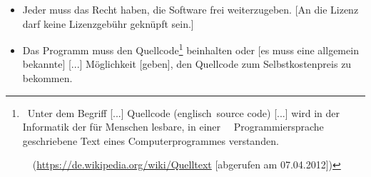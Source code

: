 \documentclass[a4paper]{article}
\newcommand\liststyleWWviiiNumi{%
\renewcommand\theenumi{\arabic{enumi}}
\renewcommand\theenumii{\arabic{enumii}}
\renewcommand\theenumiii{\arabic{enumiii}}
\renewcommand\labelitemi{{}-}
\renewcommand\labelenumi{\theenumi.}
\renewcommand\labelenumii{\theenumii.}
\renewcommand\labelenumiii{\theenumiii.}
}
\newcommand\liststyleWWviiiNumiii{%
\renewcommand\theenumi{\arabic{enumi}}
\renewcommand\theenumii{\arabic{enumii}}
\renewcommand\theenumiii{\arabic{enumiii}}
\renewcommand\labelitemi{{}-}
\renewcommand\labelenumi{\theenumi.}
\renewcommand\labelenumii{\theenumii.}
\renewcommand\labelenumiii{\theenumiii.}
}
\begin{document}
\liststyleWWviiiNumi
\begin{itemize}
\item {
Jeder muss das Recht haben, die Software frei weiterzugeben. [An die
Lizenz darf keine Lizenzgeb\"uhr gekn\"upft sein.]}
\item {
Das Programm muss den Quellcode\footnote{\ {\guillemotright}Unter dem
Begriff [...] Quellcode (englisch~source code) [...] wird in der
Informatik der f\"ur Menschen lesbare, in einer \ \ Programmiersprache
geschriebene Text eines Computerprogrammes
verstanden.{\guillemotleft}\par
\ \ (\url{https://de.wikipedia.org/wiki/Quelltext} [abgerufen am
07.04.2012])} beinhalten oder [es muss eine allgemein bekannte] [...]
M\"oglichkeit [geben], den Quellcode zum Selbstkostenpreis zu
bekommen.}
\end{itemize}
\liststyleWWviiiNumiii
\end{document}
